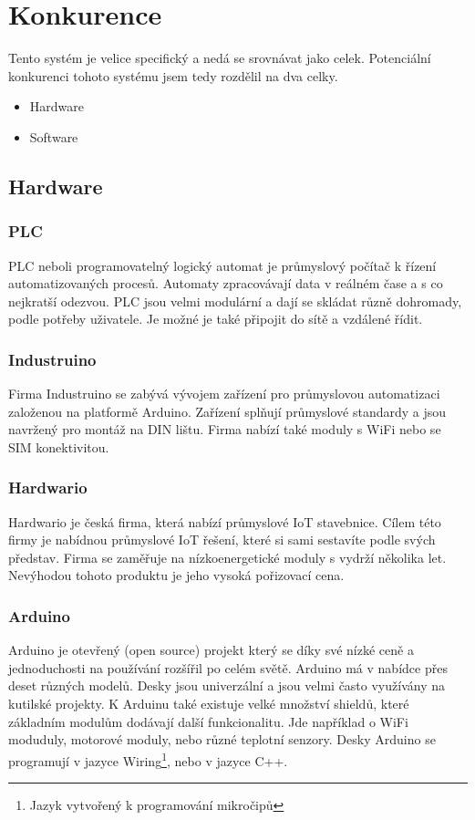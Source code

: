 \chapter{Konkurence}
Tento systém je velice specifický a nedá se srovnávat jako celek. 
Potenciální konkurenci tohoto systému jsem tedy rozdělil na dva celky.

\begin{itemize} %
    \item Hardware
    \item Software
\end{itemize}



\section{Hardware}
\fxnote[author=JA]{\textcolor{mygreen}{Přidat obrázky}}

\subsection{PLC}
PLC neboli programovatelný logický automat je průmyslový počítač k řízení automatizovaných procesů.
Automaty zpracovávají data v reálném čase a s co nejkratší odezvou.
PLC jsou velmi modulární a dají se skládat různě dohromady, podle potřeby uživatele.
Je možné je také připojit do sítě a vzdálené řídit.


\subsection{Industruino}
Firma Industruino\cite{INDUSTRINO} se zabývá vývojem zařízení pro průmyslovou automatizaci založenou na platformě Arduino.
Zařízení splňují průmyslové standardy a jsou navržený pro montáž na  DIN lištu. Firma nabízí také moduly s WiFi nebo se SIM konektivitou.


\subsection{Hardwario}
Hardwario\cite{HARDWARIO} je česká firma, která nabízí průmyslové IoT stavebnice.
Cílem této firmy je nabídnou průmyslové IoT řešení, které si sami sestavíte podle svých představ.
Firma se zaměřuje na nízkoenergetické moduly s vydrží několika let.
Nevýhodou tohoto produktu je jeho vysoká pořizovací cena. 
\fxnote[author=JA]{\textcolor{mygreen}{Cena???}}


\subsection{Arduino}
Arduino \cite{ARDUGREENHOUSE} je otevřený (open source) projekt který se díky své nízké ceně a jednoduchosti na používání rozšířil po celém světě.
Arduino má v nabídce přes deset různých modelů. Desky jsou univerzální a jsou velmi často využívány na kutilské projekty.
K Arduinu také existuje velké množství shieldů, které základním modulům dodávají další funkcionalitu. 
Jde například o WiFi moduduly, motorové moduly, nebo různé teplotní senzory.
Desky Arduino se programují v jazyce Wiring\footnote{Jazyk vytvořený k programování mikročipů}, nebo v jazyce C++. 




